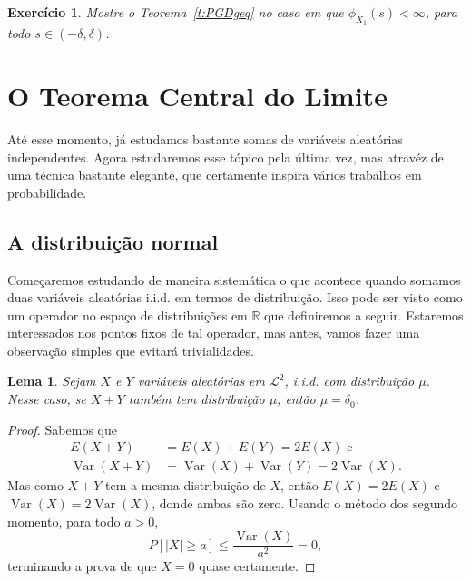 \documentclass[reqno]{article}
\newcommand*\1{\mathds{1}}
\newtheorem{lemma}[theorem]{Lema}
\DeclareMathOperator{\Var}{Var}
\newtheorem{exercise}[example]{Exercício}
\begin{document}
\begin{exercise}
  Mostre o Teorema~\ref{t:PGDgeq} no caso em que $\phi_{X_1}(s) < \infty$, para todo $s \in (-\delta, \delta)$.
\end{exercise}

\newpage

\section{O Teorema Central do Limite}

Até esse momento, já estudamos bastante somas de variáveis aleatórias independentes.
Agora estudaremos esse tópico pela última vez, mas atravéz de uma técnica bastante elegante, que certamente inspira vários trabalhos em probabilidade.

\subsection{A distribuição normal}

Começaremos estudando de maneira sistemática o que acontece quando somamos duas variáveis aleatórias i.i.d. em termos de distribuição.
Isso pode ser visto como um operador no espaço de distribuições em $\mathbb{R}$ que definiremos a seguir.
Estaremos interessados nos pontos fixos de tal operador, mas antes, vamos fazer uma observação simples que evitará trivialidades.

\begin{lemma}
  Sejam $X$ e $Y$ variáveis aleatórias em $\mathcal{L}^2$, i.i.d. com distribuição $\mu$.
  Nesse caso, se $X + Y$ também tem distribuição $\mu$, então $\mu = \delta_0$.
\end{lemma}

\begin{proof}
  Sabemos que
  \begin{equation}
    \begin{split}
      E(X + Y) & = E(X) + E(Y) = 2 E(X) \text{ e}\\
      \Var(X + Y) & = \Var(X) + \Var(Y) = 2 \Var(X).
    \end{split}
  \end{equation}
  Mas como $X + Y$ tem a mesma distribuição de $X$, então $E(X) = 2 E(X)$ e $\Var(X) = 2 \Var(X)$, donde ambas são zero.
  Usando o método dos segundo momento, para todo $a > 0$,
  \begin{equation}
    P[|X| \geq a] \leq \frac{\Var(X)}{a^2} = 0,
  \end{equation}
  terminando a prova de que $X = 0$ quase certamente.
\end{proof}
\end{document}

